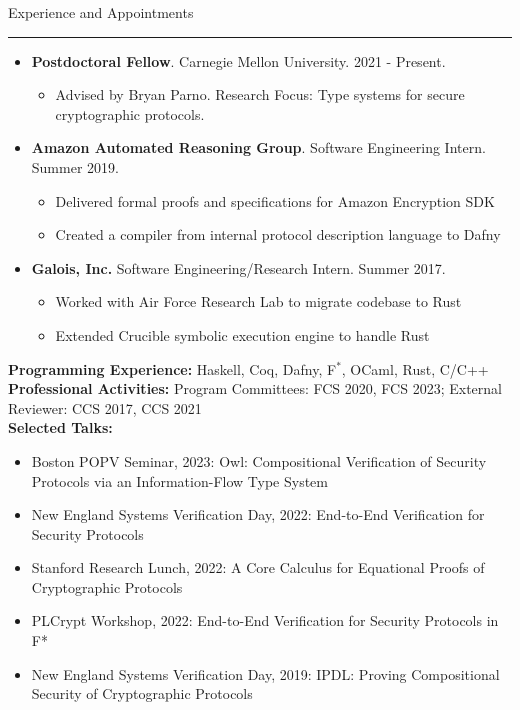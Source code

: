 \documentclass{article}
\begin{document}
\vspace{10pt}
{\huge Experience and Appointments}
\vspace{3pt}
 \hrule
\begin{itemize}
    \item {\bf Postdoctoral Fellow}. Carnegie Mellon University. 2021 - Present.
        \begin{itemize}
            \item Advised by Bryan Parno. Research Focus: Type systems for secure cryptographic protocols. 
        \end{itemize}

    \item {\bf Amazon Automated Reasoning Group}. Software Engineering Intern.
        Summer 2019.
        \begin{itemize}
            \item Delivered formal proofs and specifications for Amazon Encryption SDK
            \item Created a compiler from internal protocol description language to Dafny
        \end{itemize}

    \item {\bf Galois, Inc.} Software Engineering/Research Intern. Summer 2017.
        \begin{itemize}
            \item Worked with Air Force Research Lab to migrate codebase to Rust
            \item Extended Crucible symbolic execution engine to handle Rust
        \end{itemize}

\end{itemize}
    {\bf Programming Experience:} Haskell, Coq, Dafny, F$^*$, OCaml, Rust, C/C++
    \\
    {\bf Professional Activities:} Program Committees: FCS 2020, FCS 2023; External Reviewer: CCS 2017, CCS 2021
    \\
    {\bf Selected Talks:} 
    \begin{itemize}
        \item Boston POPV Seminar, 2023: Owl: Compositional Verification of
            Security Protocols via an Information-Flow Type System
        \item New England Systems Verification Day, 2022:  End-to-End Verification for Security Protocols
        \item Stanford Research Lunch, 2022: A Core Calculus for Equational Proofs of Cryptographic Protocols
        \item PLCrypt Workshop, 2022: End-to-End Verification for Security Protocols in F* 
        \item New England Systems Verification Day, 2019: IPDL: Proving Compositional Security of Cryptographic Protocols
    \end{itemize}
\end{document}
